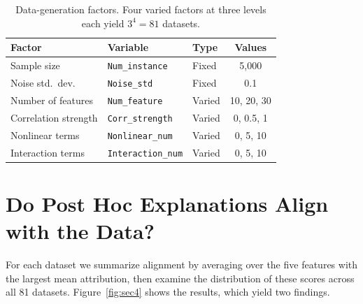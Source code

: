 \documentclass[12pt,letterpaper]{article}
\begin{document}
\begin{table}[t]
\centering\small
\caption{Data-generation factors. Four varied factors at three levels each yield
$3^4 = 81$ datasets.}
\label{tab:factors}
\begin{tabular}{lllc}
\toprule
\textbf{Factor} & \textbf{Variable} & \textbf{Type} & \textbf{Values}\\
\midrule
Sample size          & \texttt{Num\_instance}   & Fixed  & 5{,}000\\
Noise std.\ dev.\     & \texttt{Noise\_std}      & Fixed  & 0.1\\
Number of features   & \texttt{Num\_feature}    & Varied & 10, 20, 30\\
Correlation strength & \texttt{Corr\_strength}  & Varied & 0, 0.5, 1\\
Nonlinear terms      & \texttt{Nonlinear\_num}  & Varied & 0, 5, 10\\
Interaction terms    & \texttt{Interaction\_num}& Varied & 0, 5, 10\\
\bottomrule
\end{tabular}
\end{table}

\section{Do Post Hoc Explanations Align with the Data?}
\label{sec:results}

For each dataset we summarize alignment by averaging over the five features with the
largest mean attribution, then examine the distribution of these scores across all
81 datasets. Figure~\ref{fig:sec4} shows the results, which yield two findings.
\end{document}
